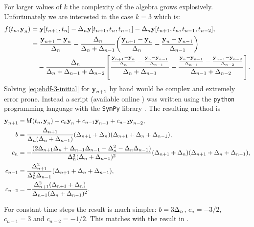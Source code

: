 For larger values of $k$ the complexity of the algebra grows explosively.
Unfortunately we are interested in the case $k=3$ which is:
\begin{equation}
  \begin{aligned}
    f(t_n, \boldsymbol{\mathrm{y}}_n) &= \boldsymbol{\mathrm{y}}[t_{n+1}, t_n] - \Delta_{n} \boldsymbol{\mathrm{y}}[t_{n+1}, t_n, t_{n-1}] -\Delta_{n} \boldsymbol{\mathrm{y}}[t_{n+1}, t_n, t_{n-1}, t_{n-2}], \\
    &=  \frac{\boldsymbol{\mathrm{y}}_{n+1} - \boldsymbol{\mathrm{y}}_n}{\Delta_{n}}
    - \frac{\Delta_{n}}{\Delta_{n} + \Delta_{n-1}} {\left(  \frac{\boldsymbol{\mathrm{y}}_{n+1} - \boldsymbol{\mathrm{y}}_n}{\Delta_{n}} - \frac{\boldsymbol{\mathrm{y}}_n - \boldsymbol{\mathrm{y}}_{n-1}}{\Delta_{n-1}} \right)} \\
    &\quad - \frac{\Delta_{n}}{\Delta_{n} + \Delta_{n-1} + \Delta_{n-2}}
         {\left[ 
           \frac{\frac{\boldsymbol{\mathrm{y}}_{n+1} - \boldsymbol{\mathrm{y}}_n}{\Delta_{n}} - \frac{\boldsymbol{\mathrm{y}}_n - \boldsymbol{\mathrm{y}}_{n-1}}{\Delta_{n-1}}}
                {\Delta_{n} +\Delta_{n-1}}
           -
           \frac{\frac{\boldsymbol{\mathrm{y}}_{n} - \boldsymbol{\mathrm{y}}_{n-1}}{\Delta_{n-1}} - \frac{\boldsymbol{\mathrm{y}}_{n-1} - \boldsymbol{\mathrm{y}}_{n-2}}{\Delta_{n-2}}}
                {\Delta_{n-1} +\Delta_{n-2}}
          \right]}.
  \end{aligned}
  \label{eq:ebdf-3-initial}
\end{equation}
Solving \cref{eq:ebdf-3-initial} for $\boldsymbol{\mathrm{y}}_{n+1}$ by hand would be complex and extremely error prone.
Instead a script (available online \cite{ebdf3-sympy-script}) was written using the \texttt{python} programming language with the \texttt{SymPy} library \cite{sympy}.
The resulting method is
\begin{equation}
  \label{eqn:ebdf-coeffs}
  \begin{aligned}
    \boldsymbol{\mathrm{y}}_{n+1} &= b {\boldsymbol{\mathrm{f}}}(t_n, \boldsymbol{\mathrm{y}}_n) + c_n \boldsymbol{\mathrm{y}}_n + c_{n-1} \boldsymbol{\mathrm{y}}_{n-1} + c_{n-2} \boldsymbol{\mathrm{y}}_{n-2}, \\
    b &= \frac{\Delta_{n+1}}{\Delta_{n} (\Delta_{n} + \Delta_{n-1})} (\Delta_{n+1} + \Delta_{n}) (\Delta_{n+1} + \Delta_{n} + \Delta_{n-1}) ,\\
    c_n &= - \frac{ (2 \Delta_{n+1} \Delta_{n} + \Delta_{n+1} \Delta_{n-1} - \Delta_{n}^{2} - \Delta_{n} \Delta_{n-1}) }{\Delta_{n}^{2} (\Delta_{n} + \Delta_{n-1})^{2}} (\Delta_{n+1} + \Delta_{n}) (\Delta_{n+1} + \Delta_{n} + \Delta_{n-1}),\\
    c_{n-1} &= \frac{\Delta_{n+1}^{2}}{\Delta_{n}^{2} \Delta_{n-1}} (\Delta_{n+1} + \Delta_{n} + \Delta_{n-1}) ,\\
    c_{n-2} &= - \frac{\Delta_{n+1}^{2} (\Delta_{n+1} + \Delta_{n})}{\Delta_{n-1} (\Delta_{n} + \Delta_{n-1})^{2}}.
  \end{aligned}
\end{equation}

For constant time steps the result is much simpler: $ b = 3\Delta_{n}$, $c_n = -3/2$, $c_{n-1} = 3$ and  $c_{n-2} = -1/2$.
This matches with the result in \cite[364]{HairerNorsettWanner}.

